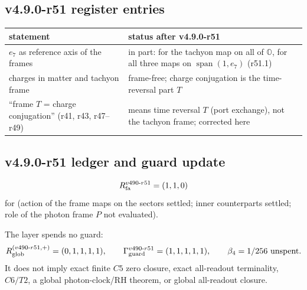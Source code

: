 \subsection*{v4.9.0-r51 register entries}
\label{subsec:v490-r51-register}

\begin{center}
\small
\begin{tabular}{@{}>{\raggedright\arraybackslash}p{}>{\raggedright\arraybackslash}p{}@{}}
\toprule
statement & status after v4.9.0-r51\\
\midrule
\(e_7\) as reference axis of the frames & in part: for the tachyon map on all of \(\mathbb O\), for all three maps on \(\operatorname{span}(1,e_7)\) (r51.1)\\
charges in matter and tachyon frame & frame-free; charge conjugation is the time-reversal part \(T\)\\
``frame \(T\) = charge conjugation'' (r41, r43, r47--r49) & means time reversal \(T\) (port exchange), not the tachyon frame; corrected here\\
\bottomrule
\end{tabular}
\end{center}

\subsection*{v4.9.0-r51 ledger and guard update}
\label{subsec:v490-r51-ledger-guard}

\[
R_{\rm fa}^{v490\text{-}r51}=(1,1,0)
\]
for (action of the frame maps on the sectors settled; inner counterparts settled; role of the photon frame \(P\) not evaluated).

The layer spends no guard:
\[
R_{\rm glob}^{(v490\text{-}r51,+)}=(0,1,1,1,1),
\qquad
\Gamma_{\rm guard}^{v490\text{-}r51}=(1,1,1,1,1),
\qquad
\beta_4=1/256\ \text{unspent}.
\]
It does not imply exact finite \(C5\) zero closure, exact all-readout terminality,
\(C6/T2\), a global photon-clock/RH theorem, or global all-readout closure.
